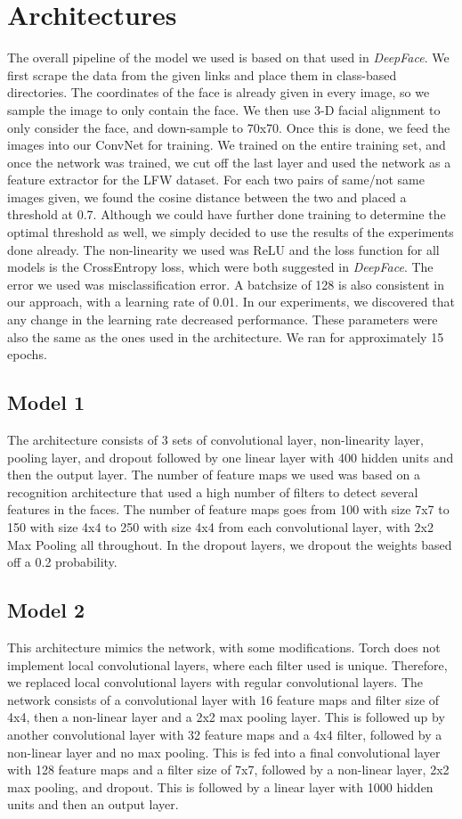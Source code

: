 \documentclass[11pt]{article}
\begin{document}
\section{Architectures} 
\par
The overall pipeline of the model we used is based on that used in \textit{DeepFace}. We first scrape the data from the given links and place them in class-based directories. The coordinates of the face is already given in every image, so we sample the image to only contain the face. We then use 3-D facial alignment to only consider the face, and down-sample to 70x70. Once this is done, we feed the images into our ConvNet for training. We trained on the entire training set, and once the network was trained, we cut off the last layer and used the network as a feature extractor for the LFW dataset. For each two pairs of same/not same images given, we found the cosine distance between the two and placed a threshold at 0.7. Although we could have further done training to determine the optimal threshold as well, we simply decided to use the results of the experiments done already. The non-linearity we used was ReLU and the loss function for all models is the CrossEntropy loss, which were both suggested in \textit{DeepFace}. The error we used was misclassification error. A batchsize of 128 is also consistent in our approach, with a learning rate of 0.01. In our experiments, we discovered that any change in the learning rate decreased performance. These parameters were also the same as the ones used in the  architecture. We ran for approximately 15 epochs. 
    \subsection{Model 1}
    The architecture consists of 3 sets of convolutional layer, non-linearity layer, pooling layer, and dropout followed by one linear layer with 400 hidden units and then the output layer. The number of feature maps we used was based on a recognition architecture that used a high number of filters to detect several features in the faces. The number of feature maps goes from 100 with size 7x7 to 150 with size 4x4 to 250 with size 4x4 from each convolutional layer, with 2x2 Max Pooling all throughout. In the dropout layers, we dropout the weights based off a 0.2 probability. 
    \subsection{Model 2}
    This architecture mimics the  network, with some modifications. Torch does not implement local convolutional layers, where each filter used is unique. Therefore, we replaced local convolutional layers with regular convolutional layers. The network consists of a convolutional layer with 16 feature maps and filter size of 4x4, then a non-linear layer and a 2x2 max pooling layer. This is followed up by another convolutional layer with 32 feature maps and a 4x4 filter, followed by a non-linear layer and no max pooling. This is fed into a final convolutional layer with 128 feature maps and a filter size of 7x7, followed by a non-linear layer, 2x2 max pooling, and dropout. This is followed by a linear layer with 1000 hidden units and then an output layer.
\end{document}
